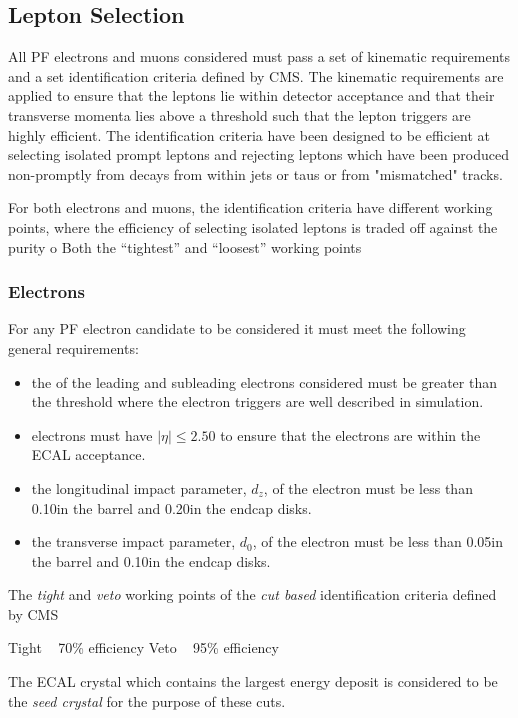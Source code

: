 \subsection{Lepton Selection}
All PF electrons and muons considered must pass a set of kinematic requirements and a set identification criteria defined by CMS.
The kinematic requirements are applied to ensure that the leptons lie within detector acceptance and that their transverse momenta lies above a threshold such that the lepton triggers are highly efficient.
The identification criteria have been designed to be efficient at selecting isolated prompt leptons and rejecting leptons which have been produced non-promptly from decays from within jets or taus or from "mismatched" tracks.

For both electrons and muons, the identification criteria have different working points, where the efficiency of selecting isolated leptons is traded off against the purity o
Both the ``tightest'' and ``loosest'' working points 

\subsubsection{Electrons}
For any PF electron candidate to be considered it must meet the following general requirements:

\begin{itemize}
\item the \pt of the leading and subleading electrons considered must be greater than the threshold where the electron triggers are well described in simulation.
\item electrons must have $|\eta| \leq 2.50$ to ensure that the electrons are within the ECAL acceptance.
\item the longitudinal impact parameter, $d_{z}$, of the electron must be less than 0.10\cm in the barrel and 0.20\cm in the endcap disks.
\item the transverse impact parameter, $d_{0}$, of the electron must be less than 0.05\cm in the barrel and 0.10\cm in the endcap disks.
\end{itemize}


The \emph{tight} and \emph{veto} working points of the  \emph{cut based} identification criteria defined by CMS 

Tight ~ 70\% efficiency
Veto ~ 95\% efficiency

The ECAL crystal which contains the largest energy deposit is considered to be the \emph{seed crystal} for the purpose of these cuts.

